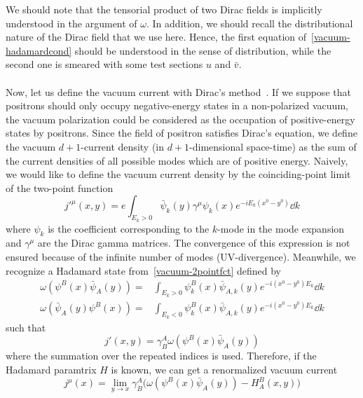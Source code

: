 We should note that the tensorial product of two Dirac fields is implicitly understood in the argument of $\omega$. 
In addition, we should recall the distributional nature of the Dirac field that we use here. 
Hence, the first equation of~\cref{vacuum-hadamardcond} should be understood in the sense of distribution,
while the second one is smeared with some test sections $u$ and $\bar{v}$. \\\\
Now, let us define the vacuum current with Dirac's method~\cite{Dirac1934}.
If we suppose that positrons should only occupy negative-energy states in a non-polarized vacuum, 
the vacuum polarization could be considered as the occupation of positive-energy states by positrons. 
Since the field of positron satisfies Dirac's equation, 
we define the vacuum $d+1$-current density (in $d+1$-dimensional space-time) as the sum of the current densities of all possible modes which are of positive energy. 
Naively, we would like to define the vacuum current density by the coinciding-point limit of the two-point function
\begin{equation}\label{vacuum-2pointfct}
j'^{\mu}(x,y) =  e \int_{E_k > 0} \bar{\psi}_k(y)\gamma^\mu \psi_k(x) e^{- i E_k(x^0 - y^0)} \dd k
\end{equation}
where $\psi_k$ is the coefficient corresponding to the $k$-mode in the mode expansion and $\gamma^\mu$ are the Dirac gamma matrices.
The convergence of this expression is not ensured because of the infinite number of modes (UV-divergence).
Meanwhile, we recognize a Hadamard state from~\cref{vacuum-2pointfct} defined by 
\begin{equation*}
\begin{split}
\omega(\psi^B(x)\bar{\psi}_A(y)) = & \int_{E_k >0} \psi_k^B(x)\bar{\psi}_{A,k}(y)e^{-i(x^0-y^0)E_k} \dd k \\
\omega(\bar{\psi}_A(y)\psi^B(x)) = & \int_{E_k <0} \psi_k^B(x)\bar{\psi}_{A,k}(y)e^{-i(x^0-y^0)E_k} \dd k 
\end{split}
\end{equation*}
such that 
\begin{equation*}
j'(x,y) = \gamma^A_B \omega(\psi^B(x)\bar{\psi}_A(y)) 
\end{equation*}
where the summation over the repeated indices is used.
Therefore, if the Hadamard paramtrix $H$ is known, we can get a renormalized vacuum current
\begin{equation*}
j^\mu(x) = \lim_{y \rightarrow x} \gamma^A_B \big(
\omega(\psi^B(x)\bar{\psi}_A(y)) - H^B_A (x, y)\big)
\end{equation*}
%
